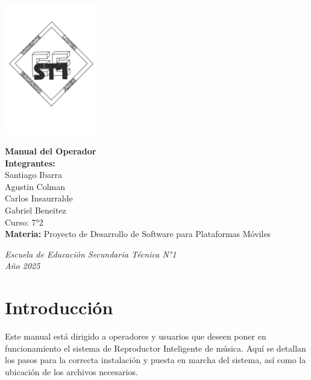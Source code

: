 \documentclass[a4paper,12pt]{article}
\begin{document}
\begin{flushright}
    \includegraphics[width=4cm]{LOGO-EEST1.png}
\end{flushright}

\vspace*{2cm}

\begin{center}
    {\LARGE\bfseries Manual del Operador} \\[1.5cm]
    \textbf{Integrantes:} \\[0.3cm]
    Santiago Ibarra \\[0.2cm]
    Agustin Colman \\[0.2cm]
    Carlos Insaurralde \\[0.2cm]
    Gabriel Beneitez \\[1.2cm]
    Curso: 7°2 \\
    \vspace{0.5cm}
    \textbf{Materia:} Proyecto de Desarrollo de Software para Plataformas Móviles
\end{center}

\vfill

\begin{center}
    \textit{Escuela de Educación Secundaria Técnica N°1} \\
    \textit{Año 2025}
\end{center}

\thispagestyle{empty}
\newpage

\tableofcontents
\newpage

\section{Introducción}\label{sec:introduccion}
Este manual está dirigido a operadores y usuarios que deseen poner en funcionamiento el sistema de Reproductor Inteligente de música. Aquí se detallan los pasos para la correcta instalación y puesta en marcha del sistema, así como la ubicación de los archivos necesarios.
\end{document}
